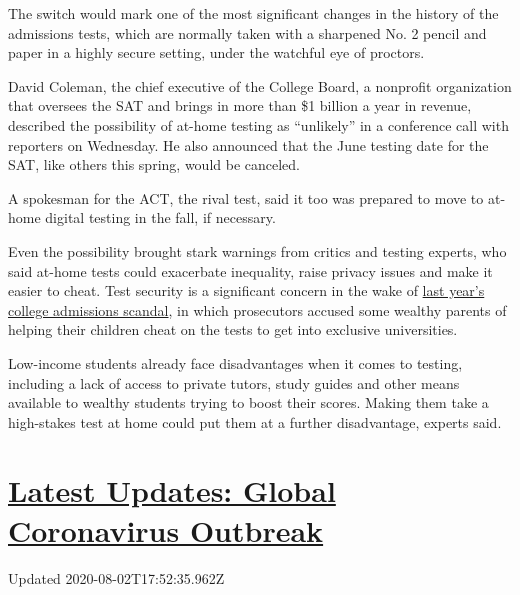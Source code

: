 The switch would mark one of the most significant changes in the history
of the admissions tests, which are normally taken with a sharpened No. 2
pencil and paper in a highly secure setting, under the watchful eye of
proctors.

David Coleman, the chief executive of the College Board, a nonprofit
organization that oversees the SAT and brings in more than \$1 billion a
year in revenue, described the possibility of at-home testing as
``unlikely'' in a conference call with reporters on Wednesday. He also
announced that the June testing date for the SAT, like others this
spring, would be canceled.

A spokesman for the ACT, the rival test, said it too was prepared to
move to at-home digital testing in the fall, if necessary.

Even the possibility brought stark warnings from critics and testing
experts, who said at-home tests could exacerbate inequality, raise
privacy issues and make it easier to cheat. Test security is a
significant concern in the wake of
\href{https://www.nytimes.com/2019/03/12/us/admissions-scandal.html}{last
year's college admissions scandal}, in which prosecutors accused some
wealthy parents of helping their children cheat on the tests to get into
exclusive universities.

Low-income students already face disadvantages when it comes to testing,
including a lack of access to private tutors, study guides and other
means available to wealthy students trying to boost their scores. Making
them take a high-stakes test at home could put them at a further
disadvantage, experts said.

\hypertarget{latest-updates-global-coronavirus-outbreak}{%
\section{\texorpdfstring{\href{https://www.nytimes.com/2020/08/01/world/coronavirus-covid-19.html?action=click\&pgtype=Article\&state=default\&region=MAIN_CONTENT_1\&context=storylines_live_updates}{Latest
Updates: Global Coronavirus
Outbreak}}{Latest Updates: Global Coronavirus Outbreak}}\label{latest-updates-global-coronavirus-outbreak}}

Updated 2020-08-02T17:52:35.962Z

